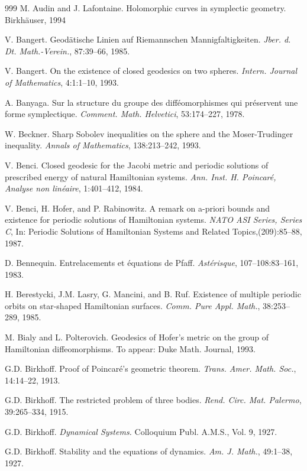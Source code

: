 \begin{thebibliography}{999}
 M. Audin and J. Lafontaine. Holomorphic curves in symplectic
geometry. Birkhäuser, 1994

 V. Bangert. Geodätische Linien auf Riemannschen
Mannigfaltigkeiten. \emph{Jber. d. Dt. Math.-Verein.}, 87:39--66, 1985.

 V. Bangert. On the existence of closed geodesics on two
spheres. \emph{Intern. Journal of Mathematics}, 4:1:1--10, 1993.

 A. Banyaga. Sur la structure du groupe des difféomorphismes
qui préservent une forme symplectique. \emph{Comment. Math. Helvetici},
53:174--227, 1978.

 W. Beckner. Sharp Sobolev inequalities on the sphere and
the Moser-Trudinger inequality. \emph{Annals of Mathematics},
138:213--242, 1993.

 V. Benci. Closed geodesic for the Jacobi metric and periodic
solutions of prescribed energy of natural Hamiltonian systems.
\emph{Ann. Inst. H. Poincaré, Analyse non linéaire}, 1:401--412, 1984.

 V. Benci, H. Hofer, and P. Rabinowitz. A remark on a-priori
bounds and existence for periodic solutions of Hamiltonian systems.
\emph{NATO ASI Series, Series C}, In: Periodic Solutions of Hamiltonian
Systems and Related Topics,(209):85--88, 1987.

 D. Bennequin. Entrelacements et équations de Pfaff.
\emph{Astérisque}, 107--108:83--161, 1983.

 H. Berestycki, J.M. Lasry, G. Mancini, and B. Ruf. Existence
of multiple periodic orbits on star-shaped Hamiltonian surfaces.
\emph{Comm. Pure Appl. Math.}, 38:253--289, 1985.

 M. Bialy and L. Polterovich. Geodesics of Hofer's metric on
the group of Hamiltonian diffeomorphisms. To appear: Duke Math. Journal,
1993.

 G.D. Birkhoff. Proof of Poincaré's geometric theorem.
\emph{Trans. Amer. Math. Soc.}, 14:14--22, 1913.

 G.D. Birkhoff. The restricted problem of three bodies.
\emph{Rend. Circ. Mat. Palermo}, 39:265--334, 1915.

 G.D. Birkhoff. \emph{Dynamical Systems.} Colloquium Publ.
A.M.S., Vol. 9, 1927.

 G.D. Birkhoff. Stability and the equations of dynamics.
\emph{Am. J. Math.}, 49:1--38, 1927.


\end{thebibliography}
